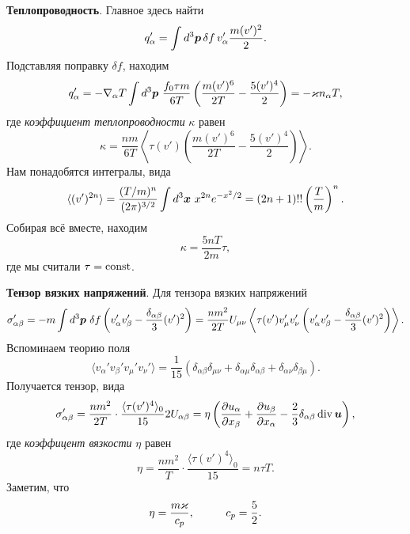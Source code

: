 \textbf{Теплопроводность}. Главное здесь найти
\begin{equation*}
	q_\alpha' = \int d^3 \boldsymbol{p}\, 
	\delta f \, v_\alpha' \frac{m (v')^2}{2}.
\end{equation*}
Подставляя поправку $\delta f$, находим
\begin{equation*}
	q_\alpha' = - \nabla_\alpha T \int d^3 \boldsymbol{p}\ \frac{f_0 \tau m}{6 T}\left(
		\frac{m (v')^6}{2T} - \frac{5 (v')^4}{2}
	\right) = - \varkappa n_\alpha T,
\end{equation*}
где \textit{коэффициент теплопроводности} $\kappa$ равен
\begin{equation*}
	\kappa = \frac{nm}{6T} \left\langle 
		\tau(v') \left(
			\frac{m (v')^6}{2T} - \frac{5 (v')^4}{2} 
		\right)
	\right\rangle.
\end{equation*}
Нам понадобятся интегралы, вида
\begin{equation*}
	\langle (v')^{2n} \rangle = \frac{(T/m)^n}{(2\pi)^{3/2}} \int d^3 \boldsymbol{x}\  x^{2n} e^{-x^2/2}
	=  (2n+1)!! \left(\frac{T}{m}\right)^n.
\end{equation*}
Собирая всё вместе, находим
\begin{equation}
	\kappa = \frac{5 n T}{2m}\tau,
\end{equation}
где мы считали $\tau = \textnormal{const}$.


\textbf{Тензор вязких напряжений}. Для тензора вязких напряжений
\begin{equation*}
	\sigma_{\alpha \beta}' =  - m \int d^3 \boldsymbol{p}\ \delta f \left(
		v_\alpha' v_\beta' - \frac{\delta_{\alpha\beta}}{3} (v')^2
	\right) = \frac{n m^2}{2T} U_{\mu \nu} \left\langle 
		\tau(v') v_\mu' v_\nu' \left(
			v_\alpha' v_\beta' - \frac{\delta_{\alpha \beta}}{3} (v')^2
		\right)
	\right\rangle.
\end{equation*}
Вспоминаем теорию поля
\begin{equation*}
	\langle v_\alpha' v_\beta' v_\mu' v_\nu' \rangle = \frac{1}{15} \left(
		\delta_{\alpha \beta} \delta_{\mu \nu} + \delta_{\alpha \mu} \delta_{\alpha \beta} + \delta_{\alpha \nu} \delta_{\beta \mu}
	\right).
\end{equation*}
Получается тензор, вида
\begin{equation*}
	\sigma_{\alpha \beta}' = \frac{n m^2}{2T} \cdot \frac{\langle \tau (v')^4\rangle_0}{15} 2 U_{\alpha \beta} = \eta \left(
		\frac{\partial u_\alpha}{\partial x_\beta} + \frac{\partial u_\beta}{\partial x_\alpha} - \frac{2}{3} \delta_{\alpha \beta} \mathop{\mathrm{div}}\nolimits \boldsymbol{u}
	\right),
\end{equation*}
где \textit{коэффицент вязкости} $\eta$ равен
\begin{equation}
	\eta = \frac{n m^2}{T} \cdot \frac{\langle \tau (v')^4\rangle_0}{15}= n \tau T.
\end{equation}
Заметим, что
\begin{equation*}
	\eta = \frac{m \kappa}{c_p}, 
	\hspace{10 mm} 
	c_p = \frac{5}{2}.
\end{equation*}


